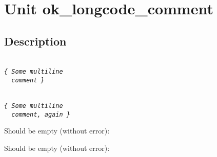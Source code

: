 \documentclass{report}
\begin{document}
\label{toc}\tableofcontents
\newpage
\newlength{\tmplength}
\chapter{Unit ok{\_}longcode{\_}comment}
\label{ok_longcode_comment}
\section{Description}
\texttt{\\\nopagebreak[3]
\textit{{\{}~Some~multiline\\\nopagebreak[3]
~~comment~{\}}}\\
}

\texttt{\\\nopagebreak[3]
\textit{{\{}~Some~multiline\\\nopagebreak[3]
~~comment,~again~{\}}}\\
}

Should be empty (without error):

\texttt{}

Should be empty (without error):

\texttt{}
\end{document}

